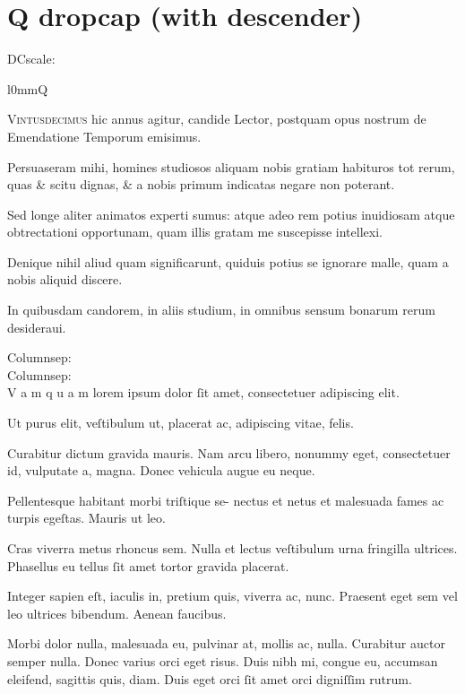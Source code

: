 \chapter{Q dropcap (with descender)}
\setcounter{parcount}{0}
\begin{parnumbers}

\setlength{\dcunit}{1.1\baselineskip}
\setlength{\dcscale}{3\dcunit}
\addtolength{\dcscale}{-0.5\dcunit}
DCscale: \the\dcscale

\setlength{\columnsep}{1pt}\begin{wrapfigure}[3]{l}{0mm}{\dropcapfont\fontsize{\dcscale}{1em}\selectfont Q}\end{wrapfigure}
\textsc{Vintusdecimus} hic annus agitur, candide Lector, postquam opus nostrum de Emendatione Temporum emisimus.

Persuaseram mihi, homines studiosos aliquam nobis gratiam habituros tot rerum, quas \& scitu dignas, \& a nobis primum indicatas negare non poterant.

Sed longe aliter animatos experti sumus: atque adeo rem potius inuidiosam atque obtrectationi opportunam, quam illis gratam me suscepisse intellexi.

Denique nihil aliud quam significarunt, quiduis potius se ignorare malle, quam a nobis aliquid discere.

In quibusdam candorem, in aliis studium, in omnibus sensum bonarum rerum desideraui.

Columnsep: \the\columnsep\\
\setlength{\columnsep}{1pt}
Columnsep: \the\columnsep\\

 V a m q u a m lorem ipsum dolor ſit amet, consectetuer adipiscing elit. 

Ut purus elit, veſtibulum ut, placerat ac, adipiscing vitae, felis. 

Curabitur dictum gravida mauris. Nam arcu libero, nonummy eget, consectetuer id, vulputate a, magna. Donec vehicula augue eu neque. 

Pellentesque habitant morbi triſtique se- nectus et netus et malesuada fames ac turpis egeſtas. Mauris ut leo. 

Cras viverra metus rhoncus sem. Nulla et lectus veſtibulum urna fringilla ultrices. Phasellus eu tellus ſit amet tortor gravida placerat. 

Integer sapien eſt, iaculis in, pretium quis, viverra ac,
nunc. Praesent eget sem vel leo ultrices bibendum. Aenean faucibus. 

Morbi dolor nulla, malesuada eu, pulvinar at, mollis ac, nulla. Curabitur auctor semper nulla. Donec varius orci eget risus. Duis nibh mi, congue eu, accumsan eleifend, sagittis quis, diam. Duis eget orci ſit amet orci digniſſim rutrum.
\end{parnumbers}

